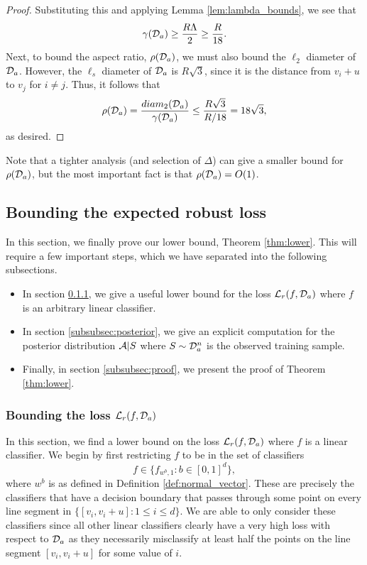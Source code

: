 \begin{proof}
Substituting this and applying Lemma \ref{lem:lambda_bounds}, we see that $$\gamma({\mathcal D}_a) \geq \frac{R\Lambda}{2} \geq \frac{R}{18}.$$ Next, to bound the aspect ratio, $\rho({\mathcal D}_a)$, we must also bound the $\ell_2$ diameter of ${\mathcal D}_a$. However, the $\ell_s$ diameter of ${\mathcal D}_a$ is $R\sqrt{3}$, since it is the distance from $v_i + u$ to $v_j$ for $i \neq j$. Thus, it follows that $$\rho({\mathcal D}_a) = \frac{diam_2({\mathcal D}_a)}{\gamma({\mathcal D}_a)} \leq \frac{R\sqrt{3}}{R/18} = 18\sqrt{3},$$ as desired. 
\end{proof}

Note that a tighter analysis (and selection of $\Delta$) can give a smaller bound for $\rho({\mathcal D}_a)$, but the most important fact is that $\rho({\mathcal D}_a) = O(1)$. 

\subsection{Bounding the expected robust loss}\label{subsec:bound_expectation}

In this section, we finally prove our lower bound, Theorem \ref{thm:lower}. This will require a few important steps, which we have separated into the following subsections. 
\begin{itemize}
	\item In section \ref{subsubsec:loss_bounding}, we give a useful lower bound for the loss $\mathcal L_r(f, {\mathcal D}_a)$ where $f$ is an arbitrary linear classifier. 
	\item In section \ref{subsubsec:posterior}, we give an explicit computation for the posterior distribution $\mathcal{A}|S$ where $S \sim {\mathcal D}_a^n$ is the observed training sample. 
	\item Finally, in section \ref{subsubsec:proof}, we present the proof of Theorem \ref{thm:lower}.
\end{itemize}

\subsubsection{Bounding the loss $\mathcal L_r(f, {\mathcal D}_a)$}\label{subsubsec:loss_bounding}

In this section, we find a lower bound on the loss $\mathcal L_r(f, {\mathcal D}_a)$ where $f$ is a linear classifier. We begin by first restricting $f$ to be in the set of classifiers $$f \in \{f_{w^b, 1}: b \in [0, 1]^d\},$$ where $w^b$ is as defined in Definition \ref{def:normal_vector}. These are precisely the classifiers that have a decision boundary that passes through some point on every line segment in $\{[v_i, v_i + u]: 1 \leq i \leq d\}$. We are able to only consider these classifiers since all other linear classifiers clearly have a very high loss with respect to ${\mathcal D}_a$ as they necessarily misclassify at least half the points on the line segment $[v_i, v_i + u]$ for some value of $i$. 

